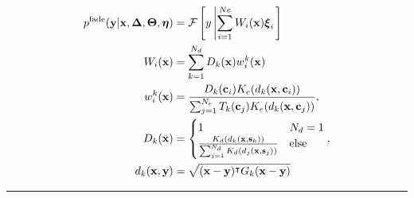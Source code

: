 		\begin{table}
			\begin{align}
				p^\text{fade}(\y | \vec{x},\vec{\Delta}, \vT, \vec{\eta}) & = \mathcal{F}\left[y  \left| \sum_{i=1}^{Ne} W_i(\vec{x})\vec{\xi}_i\right.\right]
				\\
				W_i(\vec{x})                                              & = \sum_{k=1}^{N_d} D_k(\vec{x}) w_i^k(\vec{x})
				\\
				w_i^k(\vec{x})                                            & = \frac{D_k(\vec{c}_i) K_e(d_k(\vec{x},\vec{c}_i))}{\sum_{j=1}^{N_e} T_k(\vec{c}_j) K_e(d_k(\vec{x},\vec{c}_j))},
				\\
				D_k(\vec{x})                                              & =  \begin{cases}
					                                                               1                                              & N_d = 1     \\
					                                                               \frac{K_d(d_k(\vec{x},\vec{s}_k))}
					                                                               {\sum_{j=1}^{N_d} K_d(d_j(\vec{x},\vec{s}_j))} & \text{else}
				                                                               \end{cases},
				\\
				d_k(\x,\y)                                                & = \sqrt{(\x-\y)^\intercal G_k (\x -\y)}
			\end{align}
			\hrule


\end{table}
